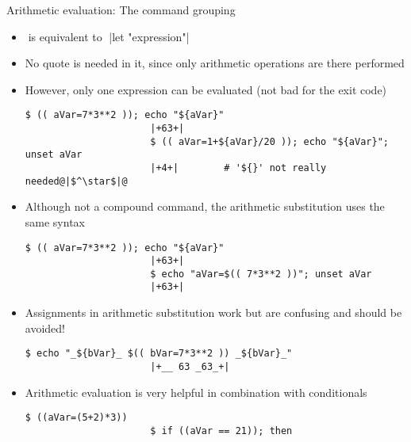 \begin{frame}[fragile]{Arithmetic evaluation: The command grouping \PB{\texttt{((\ldots))}}}
    \vspace{-4mm}
    \begin{overlayarea}{\textwidth}{0.7\textheight}
        \begin{itemize}
            \item<only@1>  $\;$is  equivalent to$\;$ \bash|let "expression"|
            \item<only@1> No quote is needed in it, since only arithmetic operations are there performed
            \item<only@1> However, only one expression can be evaluated (not bad for the exit code)
                  \begin{lstlisting}[style=MyBash, style=oddnumbers, aboveskip=2mm, belowskip=-6mm]
                      $ (( aVar=7*3**2 )); echo "${aVar}"
                      |+63+|
                      $ (( aVar=1+${aVar}/20 )); echo "${aVar}"; unset aVar
                      |+4+|        # '${}' not really needed@|$^\star$|@
                  \end{lstlisting}
            \item<only@1> Although not a compound command, the arithmetic substitution uses the same syntax
                  \begin{lstlisting}[style=MyBash, style=oddnumbers, aboveskip=2mm, belowskip=-6mm, firstnumber=4]
                      $ (( aVar=7*3**2 )); echo "${aVar}"
                      |+63+|
                      $ echo "aVar=$(( 7*3**2 ))"; unset aVar
                      |+63+|
                  \end{lstlisting}
            \item<only@1> Assignments in arithmetic substitution work but are confusing and should be avoided!
                  \begin{lstlisting}[style=MyBash, style=oddnumbers, aboveskip=2mm, belowskip=-6mm, firstnumber=8]
                      $ echo "_${bVar}_ $(( bVar=7*3**2 )) _${bVar}_"
                      |+__ 63 _63_+|
                  \end{lstlisting}
            \item<only@2> Arithmetic evaluation is very helpful in combination with conditionals
                  \begin{lstlisting}[style=MyBash, aboveskip=2mm, belowskip=-6mm, firstnumber=11]
                      $ ((aVar=(5+2)*3))
                      $ if ((aVar == 21)); then

\end{lstlisting}
\end{itemize}
\end{overlayarea}
\end{frame}
